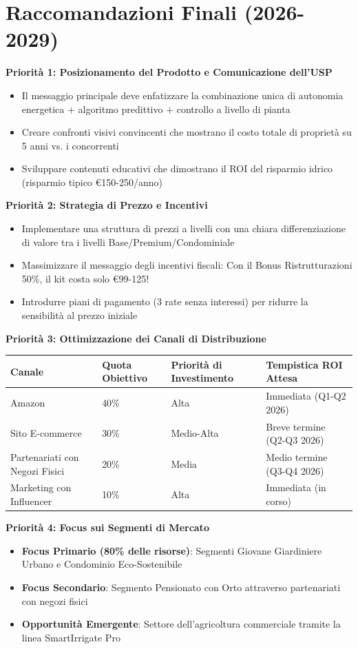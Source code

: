 \documentclass[11pt,a4paper]{report}
\begin{document}
\section{Raccomandazioni Finali (2026-2029)}

\textbf{Priorità 1: Posizionamento del Prodotto e Comunicazione dell'USP}
\begin{itemize}
    \item Il messaggio principale deve enfatizzare la combinazione unica di autonomia energetica + algoritmo predittivo + controllo a livello di pianta
    \item Creare confronti visivi convincenti che mostrano il costo totale di proprietà su 5 anni vs. i concorrenti
    \item Sviluppare contenuti educativi che dimostrano il ROI del risparmio idrico (risparmio tipico €150-250/anno)
\end{itemize}

\textbf{Priorità 2: Strategia di Prezzo e Incentivi}
\begin{itemize}
    \item Implementare una struttura di prezzi a livelli con una chiara differenziazione di valore tra i livelli Base/Premium/Condominiale
    \item Massimizzare il messaggio degli incentivi fiscali: Con il Bonus Ristrutturazioni 50\%, il kit costa solo €99-125!
    \item Introdurre piani di pagamento (3 rate senza interessi) per ridurre la sensibilità al prezzo iniziale
\end{itemize}

\textbf{Priorità 3: Ottimizzazione dei Canali di Distribuzione}

\begin{longtable}{|p{2cm}|p{3cm}|p{3cm}|p{3cm}|}
\hline
\textbf{Canale} & \textbf{Quota Obiettivo} & \textbf{Priorità di Investimento} & \textbf{Tempistica ROI Attesa} \\ \hline
Amazon & 40\% & Alta & Immediata (Q1-Q2 2026) \\ \hline
Sito E-commerce & 30\% & Medio-Alta & Breve termine (Q2-Q3 2026) \\ \hline
Partenariati con Negozi Fisici & 20\% & Media & Medio termine (Q3-Q4 2026) \\ \hline
Marketing con Influencer & 10\% & Alta & Immediata (in corso) \\ \hline
\end{longtable}

\textbf{Priorità 4: Focus sui Segmenti di Mercato}
\begin{itemize}
    \item \textbf{Focus Primario (80\% delle risorse)}: Segmenti Giovane Giardiniere Urbano e Condominio Eco-Sostenibile
    \item \textbf{Focus Secondario}: Segmento Pensionato con Orto attraverso partenariati con negozi fisici
    \item \textbf{Opportunità Emergente}: Settore dell'agricoltura commerciale tramite la linea SmartIrrigate Pro
\end{itemize}
\end{document}
